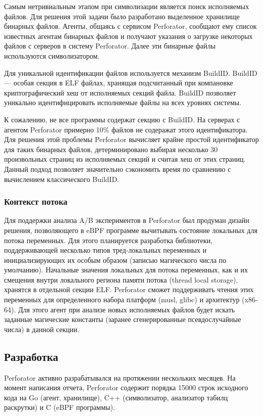 Самым нетривиальным этапом при символизации является поиск исполняемых файлов.
Для решения этой задачи было разработано выделенное хранилище бинарных файлов.
Агенты, общаясь с сервисом Perforator, сообщают ему список известных агентам бинарных файлов и получают указания
о загрузке некоторых файлов с серверов в систему Perforator.
Далее эти бинарные файлы используются символизатором.

Для уникальной идентификации файлов используется механизм BuildID.
BuildID --- особая секция в ELF файлах, хранящая подсчитанный при компановке криптографический хеш от исполняемых секций файла.
BuildID позволяет уникально идентифицировать исполняемые файлы на всех уровнях системы.

К сожалению, не все программы содержат секцию с BuildID.
На серверах с агентом Perforator примерно 10\% файлов не содеражат этого идентификатора.
Для решения этой проблемы Perforator вычисляет крайне простой идентификатор для таких бинарных файлов,
детерминировано выбирая несколько 30 произвольных страниц из исполняемых секций и считая хеш от этих страниц.
Данный подход позволяет значительно сэкономить время по сравнению с вычислением классического BuildID.

\subsubsection{Контекст потока}
Для поддержки анализа A/B экспериментов в Perforator был продуман дизайн решения, позволяющего в eBPF программе вычитывать состояние
локальных для потока переменных.
Для этого планируется разработка библиотеки, поддерживающей несколько типов тред-локальных переменных и
инициализирующих их особым образом (записью магического числа по умолчанию).
Начальные значения локальных для потока переменных, как и их смещения внутри локального региона памяти потока (thread local storage),
хранятся в отдельной секции ELF.
Perforator сможет поддерживать чтения этих переменных для определенного набора платформ (musl, glibc) и
архитектур (x86-64). Для этого агент при анализе новых исполняемых файлов будет искать заданные магические константы
(заранее сгенерированные псевдослучайные числа) в данной секции.

\subsection{Разработка}
Perforator активно разрабатывался на протяжении нескольких месяцев.
На момент написания отчета, Perforator содержит порядка 15000 строк исходного кода на Go (агент, хранилище),
C++ (символизатор, анализатор табилц раскрутки) и C (eBPF программы).

